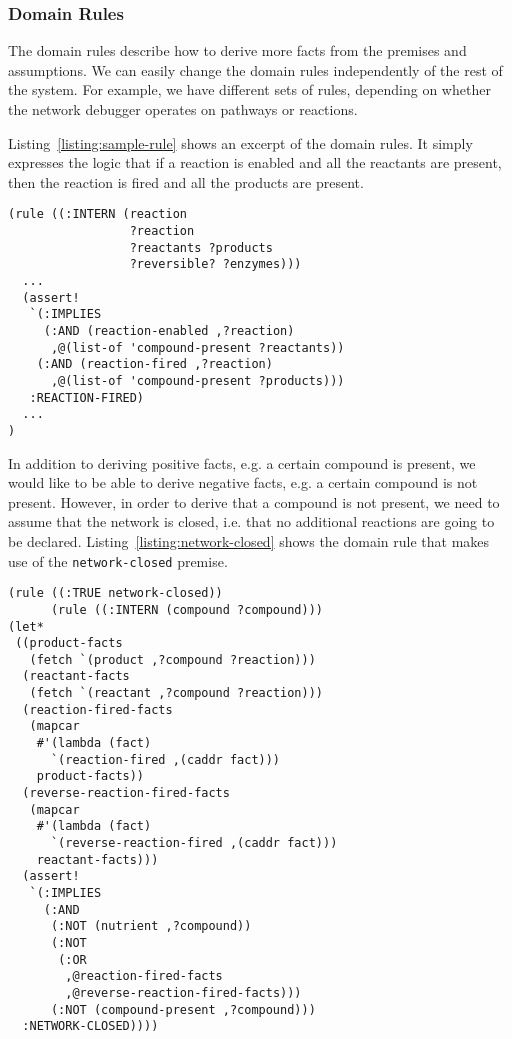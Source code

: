 \subsubsection{Domain Rules}
\label{sec:domain-rules}

The domain rules describe how to derive more facts from the premises
and assumptions. We can easily change the domain rules independently
of the rest of the system. For example, we have different sets of
rules, depending on whether the network debugger operates on pathways
or reactions.

Listing~\ref{listing:sample-rule} shows an excerpt of the domain
rules. It simply expresses the logic that if a reaction is enabled and
all the reactants are present, then the reaction is fired and all the
products are present.

\begin{lstlisting}[label={listing:sample-rule},caption={Excerpt of Domain Rules}]
(rule ((:INTERN (reaction 
                 ?reaction 
                 ?reactants ?products 
                 ?reversible? ?enzymes)))
  ...
  (assert! 
   `(:IMPLIES
     (:AND (reaction-enabled ,?reaction)
      ,@(list-of 'compound-present ?reactants))
    (:AND (reaction-fired ,?reaction)
      ,@(list-of 'compound-present ?products)))
   :REACTION-FIRED)
  ...
)
\end{lstlisting}

In addition to deriving positive facts, e.g. a certain compound is
present, we would like to be able to derive negative facts, e.g. a
certain compound is not present. However, in order to derive that a
compound is not present, we need to assume that the network is closed,
i.e. that no additional reactions are going to be
declared. Listing~\ref{listing:network-closed} shows the domain rule
that makes use of the {\small\tt network-closed} premise.

\begin{lstlisting}[label={listing:network-closed},caption={Domain rule for deriving absence of compound}]
(rule ((:TRUE network-closed))
      (rule ((:INTERN (compound ?compound)))
(let* 
 ((product-facts 
   (fetch `(product ,?compound ?reaction)))
  (reactant-facts 
   (fetch `(reactant ,?compound ?reaction)))
  (reaction-fired-facts 
   (mapcar 
    #'(lambda (fact) 
      `(reaction-fired ,(caddr fact))) 
    product-facts))
  (reverse-reaction-fired-facts 
   (mapcar 
    #'(lambda (fact) 
      `(reverse-reaction-fired ,(caddr fact))) 
    reactant-facts)))
  (assert! 
   `(:IMPLIES 
     (:AND
      (:NOT (nutrient ,?compound))
      (:NOT 
       (:OR 
        ,@reaction-fired-facts 
        ,@reverse-reaction-fired-facts)))
      (:NOT (compound-present ,?compound)))
  :NETWORK-CLOSED))))
\end{lstlisting}

